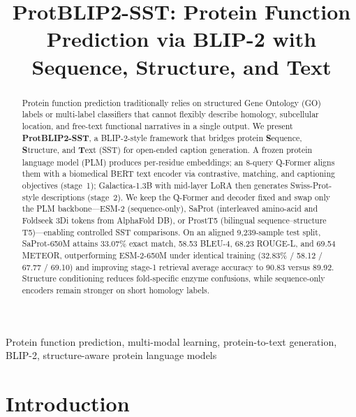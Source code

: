\documentclass[conference]{IEEEtran}
\begin{document}
\title{ProtBLIP2-SST: Protein Function Prediction via BLIP-2 with Sequence, Structure, and Text}

\author{}

\maketitle

\begin{abstract}
Protein function prediction traditionally relies on structured Gene Ontology (GO) labels or multi-label classifiers that cannot flexibly describe homology, subcellular location, and free-text functional narratives in a single output.
We present \textbf{ProtBLIP2-SST}, a BLIP-2-style framework that bridges protein \textbf{S}equence, \textbf{S}tructure, and \textbf{T}ext (SST) for open-ended caption generation.
A frozen protein language model (PLM) produces per-residue embeddings; an 8-query Q-Former aligns them with a biomedical BERT text encoder via contrastive, matching, and captioning objectives (stage~1); Galactica-1.3B with mid-layer LoRA then generates Swiss-Prot-style descriptions (stage~2).
We keep the Q-Former and decoder fixed and swap only the PLM backbone---ESM-2 (sequence-only), SaProt (interleaved amino-acid and Foldseek 3Di tokens from AlphaFold DB), or ProstT5 (bilingual sequence--structure T5)---enabling controlled SST comparisons.
On an aligned 9{,}239-sample test split, SaProt-650M attains 33.07\% exact match, 58.53 BLEU-4, 68.23 ROUGE-L, and 69.54 METEOR, outperforming ESM-2-650M under identical training (32.83\% / 58.12 / 67.77 / 69.10) and improving stage-1 retrieval average accuracy to 90.83 versus 89.92.
Structure conditioning reduces fold-specific enzyme confusions, while sequence-only encoders remain stronger on short homology labels.
\end{abstract}

\begin{IEEEkeywords}
Protein function prediction, multi-modal learning, protein-to-text generation, BLIP-2, structure-aware protein language models
\end{IEEEkeywords}

\section{Introduction}
\label{sec:intro}
\end{document}
